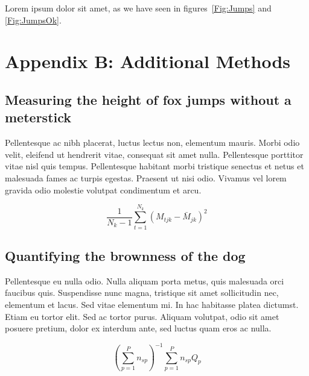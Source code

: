 \documentclass[11pt]{article}
\begin{document}
Lorem ipsum dolor sit amet, as we have seen in figures~\ref{Fig:Jumps} and \ref{Fig:JumpsOk}.

\newpage{}
\renewcommand{\theequation}{B\arabic{equation}}
\renewcommand{\thetable}{B\arabic{table}}
\setcounter{equation}{0}  %
\setcounter{table}{0}

\section*{Appendix B: Additional Methods}

\subsection*{Measuring the height of fox jumps without a meterstick}

Pellentesque ac nibh placerat, luctus lectus non, elementum mauris. 
Morbi odio velit, eleifend ut hendrerit vitae, consequat sit amet 
nulla. Pellentesque porttitor vitae nisl quis tempus. Pellentesque 
habitant morbi tristique senectus et netus et malesuada fames ac 
turpis egestas. Praesent ut nisi odio. Vivamus vel lorem gravida 
odio molestie volutpat condimentum et arcu. 

\begin{equation}
{ \frac{1}{N_k-1} \sum \limits_{t=1}^{N_k} (M_{tjk} - \bar{M}_{jk})^2}
\end{equation}

\subsection*{Quantifying the brownness of the dog}

Pellentesque eu nulla odio. Nulla aliquam porta metus, quis malesuada orci faucibus quis. Suspendisse nunc magna, tristique sit amet sollicitudin nec, elementum et lacus. Sed vitae elementum mi. In hac habitasse platea dictumst. Etiam eu tortor elit. Sed ac tortor purus. Aliquam volutpat, odio sit amet posuere pretium, dolor ex interdum ante, sed luctus quam eros ac nulla. 

\begin{equation}
{ (\sum \limits_{p=1}^P {n_{sp}})^{-1}\sum \limits_{p=1}^P {n_{sp}Q_{p}}}
\end{equation}

\newpage{}

%
%

\end{document}
